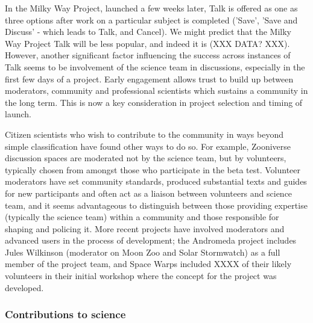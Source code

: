 \documentclass{sigchi}
\begin{document}
In the Milky Way Project, launched a few weeks later, Talk is offered as one as three options after work on a particular subject is completed ('Save', 'Save and Discuss' - which leads to Talk, and Cancel). We might predict that the Milky Way Project Talk will be less popular, and indeed it is (XXX DATA? XXX). However, another significant factor influencing the success across instances of Talk seems to be involvement of the science team in discussions, especially in the first few days of a project. Early engagement allows trust to build up between moderators, community and professional scientists which sustains a community in the long term. This is now a key consideration in project selection and timing of launch. 


Citizen scientists who wish to contribute to the community in ways beyond simple classification have found other ways to do so. For example, Zooniverse discussion spaces are moderated not by the science team, but by volunteers, typically chosen from amongst those who participate in the beta test. Volunteer moderators have set community standards, produced substantial texts and guides for new participants and often act as a liaison between volunteers and science team, and it seems advantageous to distinguish between those providing expertise (typically the science team) within a community and those responsible for shaping and policing it. More recent projects have involved moderators and advanced users in the process of development; the Andromeda project includes Jules Wilkinson (moderator on Moon Zoo and Solar Stormwatch) as a full member of the project team, and Space Warps included XXXX of their likely volunteers in their initial workshop where the concept for the project was developed. 

\subsubsection{Contributions to science}


\end{document}
